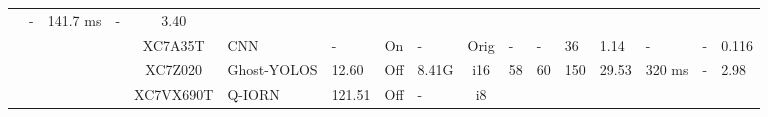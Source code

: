 \documentclass{article}
\begin{document}
\begin{table}
\begin{adjustbox}{totalheight=\baselineskip,}
\begin{tabular}{ccccclp{2em}cp{3em}cp{2em}p{4em}p{3em}p{3.5em}p{3.5em}p{2.5em}p{3em}}
                                                   &\multirow{1}{*}{-}
                                                       &\multirow{1}{*}{141.7 ms}
                                                           &\multirow{1}{*}{-}
                                                               &\multirow{1}{*}{3.40}\\
\cmidrule{4-17}
   &   &   &\multirow{1}{*}{\cite{vitoloRealTimeOnboardSatellite2024}}
               &\multirow{1}{*}{XC7A35T}
                   &\multirow{1}{*}{CNN}
                       &\multirow{1}{*}{-}
                           &\multirow{1}{*}{On}
                               &\multirow{1}{*}{-}
                                   &\multirow{1}{*}{Orig}
                                       &\multirow{1}{*}{-}
                                           &\multirow{1}{*}{-}
                                               &\multirow{1}{*}{36}
                                                   &\multirow{1}{*}{1.14}
                                                       &\multirow{1}{*}{-}
                                                           &\multirow{1}{*}{-}
                                                               &\multirow{1}{*}{0.116}\\
\cmidrule{4-17}
   &   &   &\multirow{1}{*}{\cite{yangLightweightDetectionMethod2023}}
               &\multirow{1}{*}{XC7Z020}
                   &\multirow{1}{*}{Ghost-YOLOS}
                       &\multirow{1}{*}{12.60}
                           &\multirow{1}{*}{Off}
                               &\multirow{1}{*}{8.41G}
                                   &\multirow{1}{*}{i16}
                                       &\multirow{1}{*}{58}
                                           &\multirow{1}{*}{60}
                                               &\multirow{1}{*}{150}
                                                   &\multirow{1}{*}{29.53}
                                                       &\multirow{1}{*}{320 ms}
                                                           &\multirow{1}{*}{-}
                                                               &\multirow{1}{*}{2.98}\\
\cmidrule{4-17}
   &   &   &\multirow{1}{*}{\cite{zhangEfficientFPGABasedImplementation2020}}
               &\multirow{1}{*}{XC7VX690T}
                   &\multirow{1}{*}{Q-IORN}
                       &\multirow{1}{*}{121.51}
                           &\multirow{1}{*}{Off}
                               &\multirow{1}{*}{-}
                                   &\multirow{1}{*}{i8}

\end{tabular}
\end{adjustbox}
\end{table}
\end{document}
